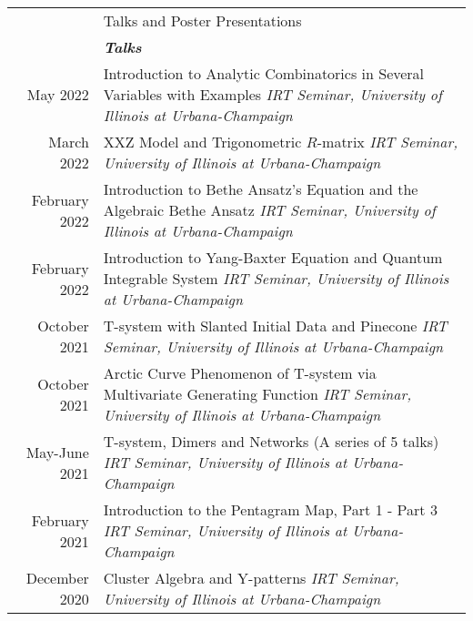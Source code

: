 \documentclass[letterpaper, 11pt]{article}
\newcommand{\headingfont}{\Large\color{Red}}
\newenvironment{SectionTable}[1]{
	\renewcommand*{\arraystretch}{1.7}
	\setlength{\tabcolsep}{10pt}
	\begin{longtable}{Rp{5.2in}} & #1 \\}
	{\end{longtable}\vspace{-.3cm}}
\begin{document}
	\begin{SectionTable}{\headingfont Talks and Poster Presentations}
		

		& \textit{\textbf{Talks}}\\


		May 2022 &
		Introduction to Analytic Combinatorics in Several Variables with Examples \newline
		\textit{IRT Seminar, University of Illinois at Urbana-Champaign} \\

		March 2022 &
		XXZ Model and Trigonometric $R$-matrix \newline
		\textit{IRT Seminar, University of Illinois at Urbana-Champaign} \\


		February 2022 &
		Introduction to Bethe Ansatz's Equation and the Algebraic Bethe Ansatz\newline
		\textit{IRT Seminar, University of Illinois at Urbana-Champaign} \\

		February 2022 &
		Introduction to Yang-Baxter Equation and Quantum Integrable System\newline
		\textit{IRT Seminar, University of Illinois at Urbana-Champaign} \\
		
		October 2021 &
		T-system with Slanted Initial Data and Pinecone \newline
		\textit{IRT Seminar, University of Illinois at Urbana-Champaign} \\
		

		October 2021 &
		Arctic Curve Phenomenon of T-system via Multivariate Generating Function\newline
		\textit{IRT Seminar, University of Illinois at Urbana-Champaign} \\
		
		May-June 2021 &
		T-system, Dimers and Networks (A series of 5 talks) \newline
		\textit{IRT Seminar, University of Illinois at Urbana-Champaign} \\
		

		February 2021 &
		Introduction to the Pentagram Map, Part 1 - Part 3 \newline
		\textit{IRT Seminar, University of Illinois at Urbana-Champaign} \\
		
		December 2020 &
		Cluster Algebra and Y-patterns \newline
		\textit{IRT Seminar, University of Illinois at Urbana-Champaign} \\
		

\end{SectionTable}
\end{document}
